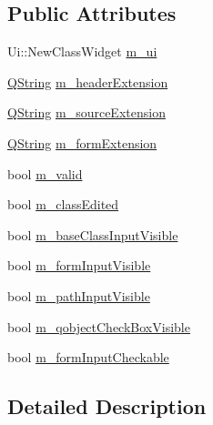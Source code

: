 \subsection*{\-Public \-Attributes}
\begin{DoxyCompactItemize}
\item 
\-Ui\-::\-New\-Class\-Widget \hyperlink{struct_utils_1_1_new_class_widget_private_ac77c98af40bd07fd9d14e4f0e04a7bd5}{m\-\_\-ui}
\item 
\hyperlink{group___u_a_v_objects_plugin_gab9d252f49c333c94a72f97ce3105a32d}{\-Q\-String} \hyperlink{struct_utils_1_1_new_class_widget_private_aa2c6dc307213250a01848e1b0948e9ce}{m\-\_\-header\-Extension}
\item 
\hyperlink{group___u_a_v_objects_plugin_gab9d252f49c333c94a72f97ce3105a32d}{\-Q\-String} \hyperlink{struct_utils_1_1_new_class_widget_private_a57663ba2bf51531e42dae77e2b9e9ee3}{m\-\_\-source\-Extension}
\item 
\hyperlink{group___u_a_v_objects_plugin_gab9d252f49c333c94a72f97ce3105a32d}{\-Q\-String} \hyperlink{struct_utils_1_1_new_class_widget_private_af5f72a25e0ff2277f00f79418b100604}{m\-\_\-form\-Extension}
\item 
bool \hyperlink{struct_utils_1_1_new_class_widget_private_a0a15874cfaa308a9c4d6b476ec89cae6}{m\-\_\-valid}
\item 
bool \hyperlink{struct_utils_1_1_new_class_widget_private_ae5a992cfba229575b4392b57c4f07530}{m\-\_\-class\-Edited}
\item 
bool \hyperlink{struct_utils_1_1_new_class_widget_private_a611c98a1bed9915a49d413b175d8f04e}{m\-\_\-base\-Class\-Input\-Visible}
\item 
bool \hyperlink{struct_utils_1_1_new_class_widget_private_a485151d4b70e4b735b1cd8b395f47163}{m\-\_\-form\-Input\-Visible}
\item 
bool \hyperlink{struct_utils_1_1_new_class_widget_private_a413581a7a468f2da3849013b63932487}{m\-\_\-path\-Input\-Visible}
\item 
bool \hyperlink{struct_utils_1_1_new_class_widget_private_ab1352df8bf86533b49c7554d73460407}{m\-\_\-qobject\-Check\-Box\-Visible}
\item 
bool \hyperlink{struct_utils_1_1_new_class_widget_private_ab96a1a9b91703038e3475355d3cb42cf}{m\-\_\-form\-Input\-Checkable}
\end{DoxyCompactItemize}


\subsection{\-Detailed \-Description}


